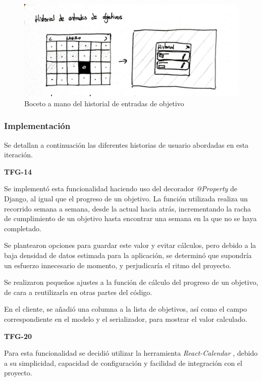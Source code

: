\documentclass[10pt, a4paper]{aqademic}
\begin{document}
\begin{figure}[h!]
	\centering
	\includegraphics[scale=0.4]{img/boceto-historial-entradas.jpg}
	\caption{Boceto a mano del historial de entradas de objetivo}
\end{figure}


\subsubsection{Implementación}

Se detallan a continuación las diferentes historias de usuario abordadas en esta iteración.

\textbf{TFG-14}

Se implementó esta funcionalidad haciendo uso del decorador \textit{@Property} de Django, al igual que el progreso de un objetivo. La función utilizada realiza un recorrido semana a semana, desde la actual hacia atrás, incrementando la racha de cumplimiento de un objetivo hasta encontrar una semana en la que no se haya completado.

Se plantearon opciones para guardar este valor y evitar cálculos, pero debido a la baja densidad de datos estimada para la aplicación, se determinó que supondría un esfuerzo innecesario de momento, y perjudicaría el ritmo del proyecto.

Se realizaron pequeños ajustes a la función de cálculo del progreso de un objetivo, de cara a reutilizarla en otras partes del código.

En el cliente, se añadió una columna a la lista de objetivos, así como el campo correspondiente en el modelo y el serializador, para mostrar el valor calculado.

\medskip

\textbf{TFG-20}

Para esta funcionalidad se decidió utilizar la herramienta \textit{React-Calendar} \cite{maj__react-calendar_nodate}, debido a su simplicidad, capacidad de configuración y facilidad de integración con el proyecto. 
\end{document}
